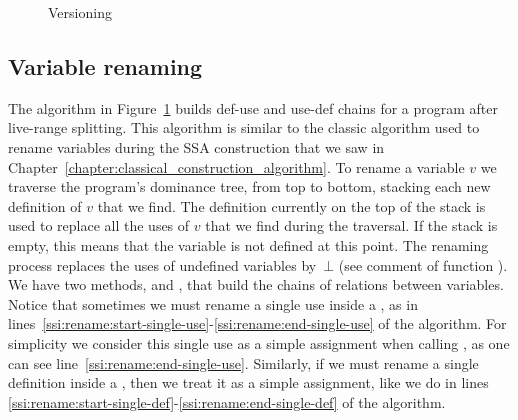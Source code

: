 {\begin{figure}[htbp]
  \begin{algorithm}[H]
  \end{algorithm}

  \begin{algorithm}[H]
  \end{algorithm}
    \caption{Versioning}
    \label{fig:Rename}
\end{figure}

\subsection{Variable renaming}


The \ssiRename algorithm in Figure~\ref{fig:Rename} builds def-use and use-def chains
for a program after live-range splitting.
This algorithm is similar to the classic algorithm used to rename variables
during the SSA construction that we saw in Chapter~\ref{chapter:classical_construction_algorithm}.
To rename a variable $v$ we traverse the program's dominance tree, from top to
bottom, stacking each new definition of $v$ that we find.
The definition currently on the top of the stack is used to replace all the
uses of $v$ that we find during the traversal.
If the stack is empty, this means that the variable is not defined at this point.
The renaming process replaces the uses of undefined variables by~$\bot$ (see comment of function \ssiStackSetUse).
We have two methods, \ssiStackSetUse and \ssiStackSetDef, that build the chains of relations between variables.
Notice that sometimes we must rename a single use inside a \phifun, as in lines~\ref{ssi:rename:start-single-use}-\ref{ssi:rename:end-single-use} of the algorithm.
For simplicity we consider this single use as a simple assignment when calling \ssiStackSetUse, as one can see line~\ref{ssi:rename:end-single-use}.
Similarly, if we must rename a single definition inside a \sigmafun, then we treat it as a simple assignment, like we do in lines \ref{ssi:rename:start-single-def}-\ref{ssi:rename:end-single-def} of the algorithm.

}
